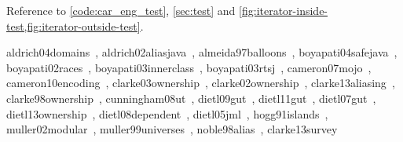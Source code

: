\documentclass{acm_proc_article-sp}
\begin{document}
Reference to \cref{code:car_eng_test}, \cref{sec:test} and
\cref{fig:iterator-inside-test,fig:iterator-outside-test}.

aldrich04domains~\cite{aldrich04domains},\newline
aldrich02aliasjava~\cite{aldrich02aliasjava},\newline
almeida97balloons~\cite{almeida97balloons},\newline
boyapati04safejava~\cite{boyapati04safejava},\newline
boyapati02races~\cite{boyapati02races},\newline
boyapati03innerclass~\cite{boyapati03innerclass},\newline
boyapati03rtsj~\cite{boyapati03rtsj},\newline
cameron07mojo~\cite{cameron07mojo},\newline
cameron10encoding~\cite{cameron10encoding},\newline
clarke03ownership~\cite{clarke03ownership},\newline
clarke02ownership~\cite{clarke02ownership},\newline
clarke13aliasing~\cite{clarke13aliasing},\newline
clarke98ownership~\cite{clarke98ownership},\newline
cunningham08ut~\cite{cunningham08ut},\newline
dietl09gut~\cite{dietl09gut},\newline
dietl11gut~\cite{dietl11gut},\newline
dietl07gut~\cite{dietl07gut},\newline
dietl13ownership~\cite{dietl13ownership},\newline
dietl08dependent~\cite{dietl08dependent},\newline
dietl05jml~\cite{dietl05jml},\newline
hogg91islands~\cite{hogg91islands},\newline
muller02modular~\cite{muller02modular},\newline
muller99universes~\cite{muller99universes},\newline
noble98alias~\cite{noble98alias}, \newline
clarke13survey~\cite{clarke13survey}





\end{document}
